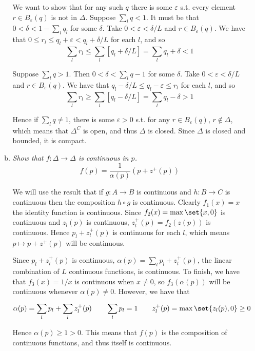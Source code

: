 \documentclass{article}
\begin{document}
\begin{enumerate}[1.]
\begin{enumerate}[a)]
        We want to show that for any such $q$ there is some $\varepsilon$ s.t. every element $r \in B_{\varepsilon}(q)$ is not in $\Delta$. Suppose $\sum^{}_{l} q < 1$.  It must be that $0 < \delta < 1 - \sum^{}_{l} q_l$ for some $\delta$. Take $0 < \varepsilon < \delta / L$ and $r \in B_{\varepsilon}(q)$. We have that $0 \le r_l \le q_l + \varepsilon < q_l + \delta / L$ for each $l$, and so
        \[
          \sum^{}_{l} r_l \le \sum^{}_{l}  \left[q_l + \delta / L\right] = \sum^{}_{l}  q_l + \delta < 1
        \]

        Suppose $\sum^{}_{l} q > 1$. Then $0 < \delta < \sum^{}_{l} q - 1$ for some $\delta$. Take $0 < \varepsilon < \delta / L$ and $r \in B_{\varepsilon}(q)$. We have that $q_l - \delta / L \le q_l - \varepsilon \le r_l$ for each $l$, and so
        \[
          \sum^{}_{l} r_l \ge \sum^{}_{l}  \left[q_l - \delta / L\right] = \sum^{}_{l} q_l - \delta > 1
        \]

        Hence if $\sum^{}_{l} q \ne 1$, there is some $\varepsilon > 0$ s.t. for any $r \in B_{\varepsilon}(q)$, $r \notin \Delta$, which means that $\Delta^C$ is open, and thus $\Delta$ is closed. Since $\Delta$ is closed and bounded, it is compact.

      \item \textit{Show that $f: \Delta \to \Delta$ is continuous in $p$.}
        \[
          f(p) = \dfrac{1}{\alpha(p)} \left(p + z^+(p)\right)
        \]

        \solution We will use the result that if $g: A \to B$ is continuous and $h: B \to C$ is continuous then the composition $h \circ g$ is continuous. Clearly $f_1(x) = x$ the identity function is continuous. Since $f_2(x) = \max\set{x, 0}$ is continuous and $z_l(p)$ is continuous, $z_l^+(p) = f_2(z(p))$ is continuous. Hence $p_l + z_l^+(p)$ is continuous for each $l$, which means $p \mapsto p + z^+(p)$ will be continuous.

        Since $p_l + z_l^+(p)$ is continuous, $\alpha(p) = \sum^{}_{l} p_l + z_l^+(p)$, the linear combination of $L$ continuous functions, is continuous. To finish, we have that $f_3(x) = 1 / x$ is continuous when $x \ne 0$, so $f_3(\alpha(p))$ will be continuous whenever $\alpha(p) \ne 0$. However, we have that
        \[
          \alpha(p) = \sum^{}_{l} p_l + \sum^{}_{l} z^+_l(p)
          \quad\quad
          \sum^{}_{l} p_l = 1
          \quad\quad
          z^+_l(p) = \max\set{z_l(p), 0} \ge 0
        \]

        Hence $\alpha(p) \ge 1 > 0$. This means that $f(p)$ is the composition of continuous functions, and thus itself is continuous.


\end{enumerate}
\end{enumerate}
\end{document}
